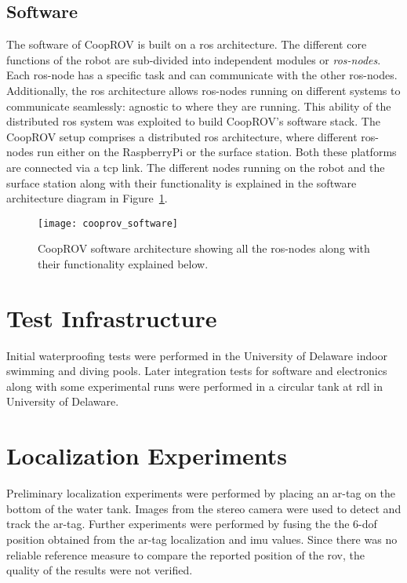 \subsection{Software}

The software of CoopROV is built on a \gls{ros} architecture. The different core functions of the robot are sub-divided into independent modules or \emph{\gls{ros}-nodes}. Each \gls{ros}-node has a specific task and can communicate with the other \gls{ros}-nodes. Additionally, the \gls{ros} architecture allows \gls{ros}-nodes running on different systems to communicate seamlessly: agnostic to where they are running. This ability of the distributed \gls{ros} system was exploited to build CoopROV's software stack. The CoopROV setup comprises a distributed \gls{ros} architecture, where different \gls{ros}-nodes run either on the RaspberryPi or the surface station. Both these platforms are connected via a \gls{tcp} link. The different nodes running on the robot and the surface station along with their functionality is explained in the software architecture diagram in Figure~\ref{fig:cooprov_software}.
%
\begin{figure}
  \centering
  \texttt{[image: cooprov\_software]}
  \caption[CoopROV software architecture]{CoopROV software architecture showing all the \gls{ros}-nodes along with their functionality explained below.}
  \label{fig:cooprov_software}
\end{figure} 


\section{Test Infrastructure}

Initial waterproofing tests were performed in the University of Delaware indoor swimming and diving pools. Later integration tests for software and electronics along with some experimental runs were performed in a circular tank at \gls{rdl} in University of Delaware.


\section{Localization Experiments}

Preliminary localization experiments were performed by placing an \gls{ar}-tag on the bottom of the water tank. Images from the stereo camera were used to detect and track the \gls{ar}-tag. Further experiments were performed by fusing the the 6-\gls{dof} position obtained from the \gls{ar}-tag localization and \gls{imu} values. Since there was no reliable reference measure to compare the reported position of the \gls{rov}, the quality of the results were not verified.


